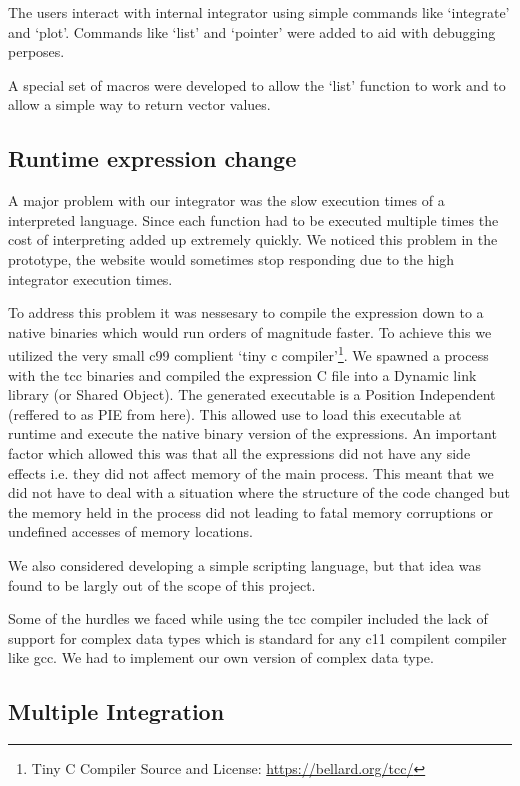 \documentclass[12pt]{article}
\begin{document}
The users interact with internal integrator using simple commands like `integrate' and `plot'. Commands like `list' and `pointer' were added to 
aid with debugging perposes.

A special set of macros were developed to allow the `list' function to work and to allow a simple way to return vector values.

\subsection{Runtime expression change}

A major problem with our integrator was the slow execution times of a interpreted language. Since each function
had to be executed multiple times the cost of interpreting added up extremely quickly. We noticed this problem in
the prototype, the website would sometimes stop responding due to the high integrator execution times.

To address this problem it was nessesary to compile the expression down to a native binaries which would run orders
of magnitude faster. To achieve this we utilized the very small c99 complient `tiny c compiler'\footnote{Tiny C Compiler Source and License: \url{https://bellard.org/tcc/}}.
We spawned a process with the tcc binaries and compiled the expression C file into a Dynamic link library (or Shared Object).
The generated executable is a Position Independent (reffered to as PIE from here). This allowed use to load this executable at runtime
and execute the native binary version of the expressions. An important factor which allowed this was that all the expressions did not have
any side effects i.e. they did not affect memory of the main process. This meant that we did not have to deal with a situation where the
structure of the code changed but the memory held in the process did not leading to fatal memory corruptions or undefined accesses of memory
locations.

We also considered developing a simple scripting language, but that idea was found to be largly out of the scope of this project.

Some of the hurdles we faced while using the tcc compiler included the lack of support for complex data types which is standard for any c11 compilent
compiler like gcc. We had to implement our own version of complex data type.

\subsection{Multiple Integration}
\end{document}

